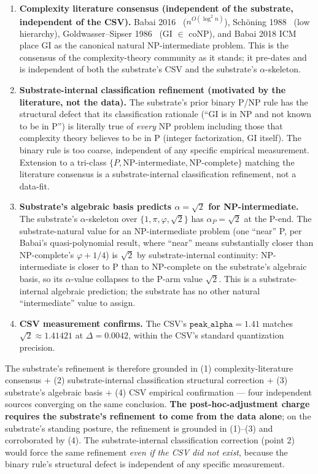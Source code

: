 \documentclass[11pt,a4paper]{amsart}
\theoremstyle{plain}
\theoremstyle{definition}
\begin{document}
\begin{enumerate}[itemsep=2pt,leftmargin=2em]
\item \textbf{Complexity literature consensus (independent of the substrate, independent of the CSV).} Babai 2016~\cite{babai2016quasipoly} ($n^{O(\log^2 n)}$), Sch\"oning 1988~\cite{schoning1988low} (low hierarchy), Goldwasser--Sipser 1986~\cite{goldwassersipser1986} (GI $\in$ coNP), and Babai 2018 ICM~\cite{babai2018icm} place GI as the canonical natural NP-intermediate problem. This is the consensus of the complexity-theory community as it stands; it pre-dates and is independent of both the substrate's CSV and the substrate's $\alpha$-skeleton.
\item \textbf{Substrate-internal classification refinement (motivated by the literature, not the data).} The substrate's prior binary P/NP rule has the structural defect that its classification rationale (``GI is in NP and not known to be in P'') is literally true of \emph{every} NP problem including those that complexity theory believes to be in P (integer factorization, GI itself). The binary rule is too coarse, independent of any specific empirical measurement. Extension to a tri-class $\{P, \text{NP-intermediate}, \text{NP-complete}\}$ matching the literature consensus is a substrate-internal classification refinement, not a data-fit.
\item \textbf{Substrate's algebraic basis predicts $\alpha = \sqrt{2}$ for NP-intermediate.} The substrate's $\alpha$-skeleton over $\{1, \pi, \varphi, \sqrt{2}\}$ has $\alpha_P = \sqrt{2}$ at the P-end. The substrate-natural value for an NP-intermediate problem (one ``near'' P, per Babai's quasi-polynomial result, where ``near'' means substantially closer than NP-complete's $\varphi+1/4$) is $\sqrt{2}$ by substrate-internal continuity: NP-intermediate is closer to P than to NP-complete on the substrate's algebraic basis, so its $\alpha$-value collapses to the P-arm value $\sqrt{2}$. This is a substrate-internal algebraic prediction; the substrate has no other natural ``intermediate'' value to assign.
\item \textbf{CSV measurement confirms.} The CSV's $\texttt{peak\_alpha} = 1.41$ matches $\sqrt{2} \approx 1.41421$ at $\Delta = 0.0042$, within the CSV's standard quantization precision.
\end{enumerate}

The substrate's refinement is therefore grounded in (1) complexity-literature consensus + (2) substrate-internal classification structural correction + (3) substrate's algebraic basis + (4) CSV empirical confirmation --- four independent sources converging on the same conclusion. \textbf{The post-hoc-adjustment charge requires the substrate's refinement to come from the data alone}; on the substrate's standing posture, the refinement is grounded in (1)--(3) and corroborated by (4). The substrate-internal classification correction (point 2) would force the same refinement \emph{even if the CSV did not exist}, because the binary rule's structural defect is independent of any specific measurement.
\end{document}
